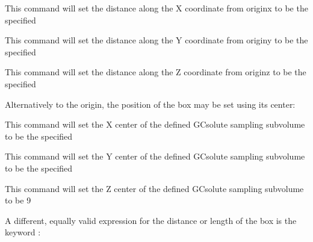 \documentclass[letterpaper,10pt,english]{sphinxmanual}
\begin{document}
This command will set the distance along the X coordinate from originx to be the specified 

%
\begin{sphinxVerbatim}[commandchars=\\\{\}]
 
\end{sphinxVerbatim}

This command will set the distance along the Y coordinate from originy to be the specified 

%
\begin{sphinxVerbatim}[commandchars=\\\{\}]
 
\end{sphinxVerbatim}

This command will set the distance along the Z coordinate from originz to be the specified 

Alternatively to the origin, the position of the box may be set using its center:

%
\begin{sphinxVerbatim}[commandchars=\\\{\}]
 
\end{sphinxVerbatim}

This command will set the X center of the defined GCsolute sampling subvolume to be the specified 

%
\begin{sphinxVerbatim}[commandchars=\\\{\}]
 
\end{sphinxVerbatim}

This command will set the Y center of the defined GCsolute sampling subvolume to be the specified 

%
\begin{sphinxVerbatim}[commandchars=\\\{\}]
 
\end{sphinxVerbatim}

This command will set the Z center of the defined GCsolute sampling subvolume to be 9

A different, equally valid expression for the distance or length of the box is the keyword :
\end{document}
